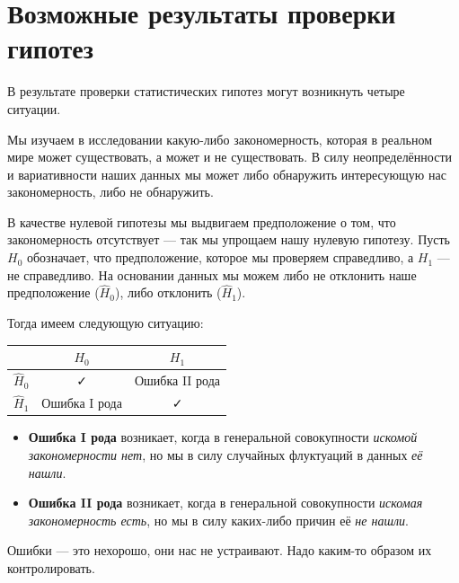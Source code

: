 \documentclass[
  letterpaper,
]{scrbook}
\providecommand{\tightlist}{%
  \setlength{\itemsep}{0pt}\setlength{\parskip}{0pt}}\usepackage{longtable,booktabs,array}
\theoremstyle{definition}
\theoremstyle{remark}
\begin{document}
\section{Возможные результаты проверки
гипотез}\label{stats-testing-results}

В результате проверки статистических гипотез могут возникнуть четыре
ситуации.

Мы изучаем в исследовании какую-либо закономерность, которая в реальном
мире может существовать, а может и не существовать. В силу
неопределённости и вариативности наших данных мы может либо обнаружить
интересующую нас закономерность, либо не обнаружить.

В качестве нулевой гипотезы мы выдвигаем предположение о том, что
закономерность отсутствует --- так мы упрощаем нашу нулевую гипотезу.
Пусть \(H_0\) обозначает, что предположение, которое мы проверяем
справедливо, а \(H_1\) --- не справедливо. На основании данных мы можем
либо не отклонить наше предположение (\(\hat H_0\)), либо отклонить
(\(\hat H_1\)).

Тогда имеем следующую ситуацию:

\begin{longtable}[]{@{}ccc@{}}
\toprule\noalign{}
& \(H_0\) & \(H_1\) \\
\midrule\noalign{}
\endhead
\bottomrule\noalign{}
\endlastfoot
\(\hat H_0\) & ✓ & Ошибка II рода \\
\(\hat H_1\) & Ошибка I рода & ✓ \\
\end{longtable}

\begin{itemize}
\tightlist
\item
  \textbf{Ошибка I рода} возникает, когда в генеральной совокупности
  \emph{искомой закономерности нет}, но мы в силу случайных флуктуаций в
  данных \emph{её нашли}.
\item
  \textbf{Ошибка II рода} возникает, когда в генеральной совокупности
  \emph{искомая закономерность есть}, но мы в силу каких-либо причин её
  \emph{не нашли}.
\end{itemize}

Ошибки --- это нехорошо, они нас не устраивают. Надо каким-то образом их
контролировать.
\end{document}
